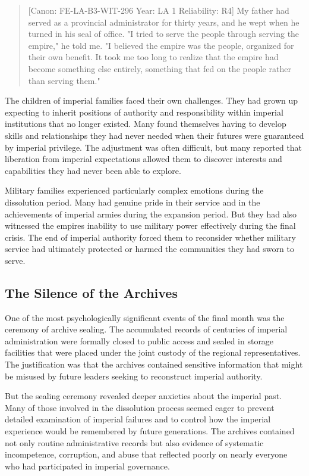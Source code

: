 \begin{quote}
{[}Canon: FE-LA-B3-WIT-296 \textbar{} Year: LA 1 \textbar{} Reliability:
R4{]} My father had served as a provincial administrator for thirty
years, and he wept when he turned in his seal of office. "I tried to
serve the people through serving the empire," he told me. "I believed
the empire was the people, organized for their own benefit. It took me
too long to realize that the empire had become something else entirely,
something that fed on the people rather than serving them."
\end{quote}

The children of imperial families faced their own challenges. They had
grown up expecting to inherit positions of authority and responsibility
within imperial institutions that no longer existed. Many found
themselves having to develop skills and relationships they had never
needed when their futures were guaranteed by imperial privilege. The
adjustment was often difficult, but many reported that liberation from
imperial expectations allowed them to discover interests and
capabilities they had never been able to explore.

Military families experienced particularly complex emotions during the
dissolution period. Many had genuine pride in their service and in the
achievements of imperial armies during the expansion period. But they
had also witnessed the empire\textquotesingle s inability to use
military power effectively during the final crisis. The end of imperial
authority forced them to reconsider whether military service had
ultimately protected or harmed the communities they had sworn to serve.

\subsection{The Silence of the
Archives}\label{the-silence-of-the-archives}

One of the most psychologically significant events of the final month
was the ceremony of archive sealing. The accumulated records of
centuries of imperial administration were formally closed to public
access and sealed in storage facilities that were placed under the joint
custody of the regional representatives. The justification was that the
archives contained sensitive information that might be misused by future
leaders seeking to reconstruct imperial authority.

But the sealing ceremony revealed deeper anxieties about the imperial
past. Many of those involved in the dissolution process seemed eager to
prevent detailed examination of imperial failures and to control how the
imperial experience would be remembered by future generations. The
archives contained not only routine administrative records but also
evidence of systematic incompetence, corruption, and abuse that
reflected poorly on nearly everyone who had participated in imperial
governance.

